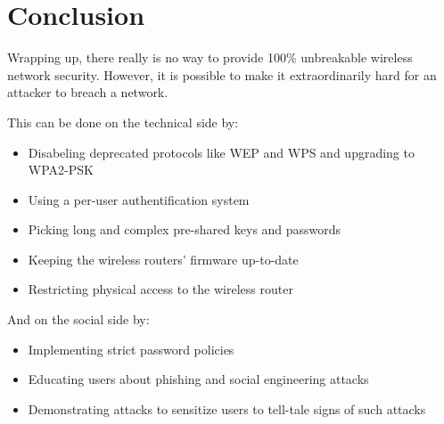 \section{Conclusion}

Wrapping up, there really is no way to provide 100\% unbreakable wireless network security. However, it is possible to make it extraordinarily hard for an attacker to breach a network. 

This can be done on the technical side by:

\begin{itemize}

\item{Disabeling deprecated protocols like WEP and WPS and upgrading to WPA2-PSK}

\item{Using a per-user authentification system}

\item{Picking long and complex pre-shared keys and passwords}

\item{Keeping the wireless routers' firmware up-to-date}

\item{Restricting physical access to the wireless router}

\end{itemize}

And on the social side by:

\begin{itemize}

\item{Implementing strict password policies}

\item{Educating users about phishing and social engineering attacks}

\item{Demonstrating attacks to sensitize users to tell-tale signs of such attacks}

\end{itemize}